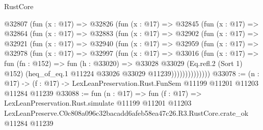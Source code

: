 \begin{lexlean}{RustCore}
\begin{coremodule}
    @32807
      (fun (x : @17) =>
      @32826
        (fun (x : @17) =>
        @32845
          (fun (x : @17) =>
          @32864
            (fun (x : @17) =>
            @32883
              (fun (x : @17) =>
              @32902
                (fun (x : @17) =>
                @32921
                  (fun (x : @17) =>
                  @32940
                    (fun (x : @17) =>
                    @32959
                      (fun (x : @17) =>
                      @32978
                        (fun (x : @17) =>
                        @32997
                          (fun (x : @17) =>
                          @33016
                            (fun (x : @17) =>
                            fun (fn : @152) =>
                            fun (h : @33020) =>
                            @33028
                              @33029
                              (Eq.refl.{2} (Sort 1) @152)
                              (heq_of_eq.{1} @11224 @33026 @33029 @11239))))))))))))))
@33078 := (n : @17) ->
  (f : @17) -> LexLeanPreservation.Rust.FunSem @11199 @11201 @11203 @11284 @11239
@33088 := fun (n : @17) =>
  fun (f : @17) =>
  LexLeanPreservation.Rust.simulate
    @11199
    @11201
    @11203
    LexLeanPreserve.C0c808a096c32bacadd6afeb58ea47c26.R3.RustCore.crate_ok
    @11284
    @11239
\end{coremodule}
\end{lexlean}
